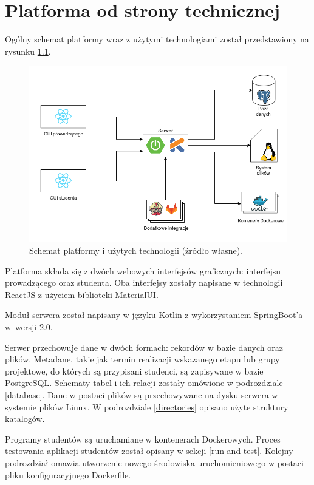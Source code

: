 \chapter{Platforma od strony technicznej}
\label{chapter:platform-technical}
Ogólny schemat platformy wraz z użytymi technologiami został przedstawiony na rysunku \ref{fig:platform-schema}.

\begin{figure}[h]
    \centering
    \includegraphics[width = 13cm]{chapter05/platform_schema.png}
    \caption{Schemat platformy i użytych technologii (źródło własne).}
    \label{fig:platform-schema}
\end{figure}

Platforma składa się z dwóch webowych interfejsów graficznych: interfejsu prowadzącego oraz studenta.
Oba interfejsy zostały napisane w technologii ReactJS z użyciem biblioteki MaterialUI.

Moduł serwera został napisany w języku Kotlin z wykorzystaniem SpringBoot’a w~wersji 2.0.

Serwer przechowuje dane w dwóch formach: rekordów w bazie danych oraz plików.
Metadane, takie jak termin realizacji wskazanego etapu lub grupy projektowe, do których są przypisani studenci, są zapisywane w bazie PostgreSQL.
Schematy tabel i ich relacji zostały omówione w podrozdziale \ref{database}.
Dane w postaci plików są przechowywane na dysku serwera w systemie plików Linux.
W podrozdziale \ref{directories} opisano użyte struktury katalogów.

Programy studentów są uruchamiane w kontenerach Dockerowych.
Proces testowania aplikacji studentów został opisany w sekcji \ref{run-and-test}.
Kolejny podrozdział omawia utworzenie nowego środowiska uruchomieniowego w postaci pliku konfiguracyjnego Dockerfile.

